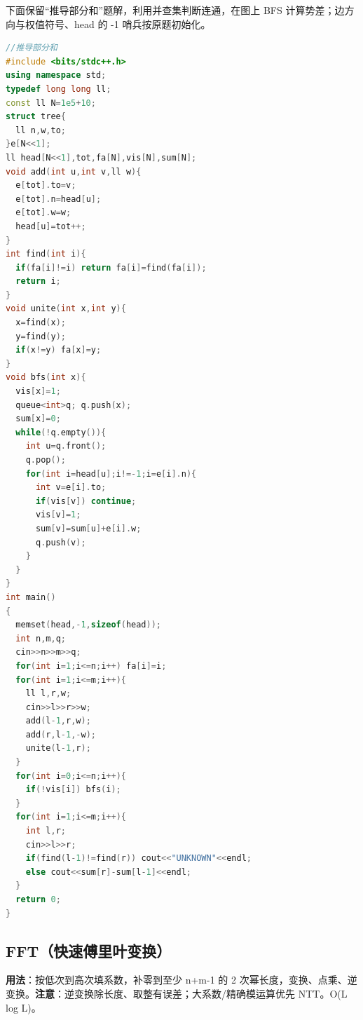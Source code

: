 \documentclass[a4paper,9pt]{extarticle}
\begin{document}
下面保留“推导部分和”题解，利用并查集判断连通，在图上 BFS 计算势差；边方向与权值符号、head 的 -1 哨兵按原题初始化。

\begin{lstlisting}[language={C++}]
//推导部分和
#include <bits/stdc++.h>
using namespace std;
typedef long long ll;
const ll N=1e5+10;
struct tree{
  ll n,w,to;
}e[N<<1];
ll head[N<<1],tot,fa[N],vis[N],sum[N];
void add(int u,int v,ll w){
  e[tot].to=v;
  e[tot].n=head[u];
  e[tot].w=w;
  head[u]=tot++;
}
int find(int i){
  if(fa[i]!=i) return fa[i]=find(fa[i]);
  return i;
}
void unite(int x,int y){
  x=find(x);
  y=find(y);
  if(x!=y) fa[x]=y;
}
void bfs(int x){
  vis[x]=1;
  queue<int>q; q.push(x);
  sum[x]=0;
  while(!q.empty()){
    int u=q.front();
    q.pop();
    for(int i=head[u];i!=-1;i=e[i].n){
      int v=e[i].to;
      if(vis[v]) continue;
      vis[v]=1;
      sum[v]=sum[u]+e[i].w;
      q.push(v);
    }
  }
}
int main()
{
  memset(head,-1,sizeof(head));
  int n,m,q;
  cin>>n>>m>>q;
  for(int i=1;i<=n;i++) fa[i]=i;
  for(int i=1;i<=m;i++){
    ll l,r,w;
    cin>>l>>r>>w;
    add(l-1,r,w);
    add(r,l-1,-w);
    unite(l-1,r);
  }
  for(int i=0;i<=n;i++){
    if(!vis[i]) bfs(i);
  }
  for(int i=1;i<=m;i++){
    int l,r;
    cin>>l>>r;
    if(find(l-1)!=find(r)) cout<<"UNKNOWN"<<endl;
    else cout<<sum[r]-sum[l-1]<<endl;
  }
  return 0;
}
\end{lstlisting}

\subsection{FFT（快速傅里叶变换）}

\textbf{用法}：按低次到高次填系数，补零到至少 n+m-1 的 2 次幂长度，变换、点乘、逆变换。\textbf{注意}：逆变换除长度、取整有误差；大系数/精确模运算优先 NTT。O(L log L)。
\end{document}
